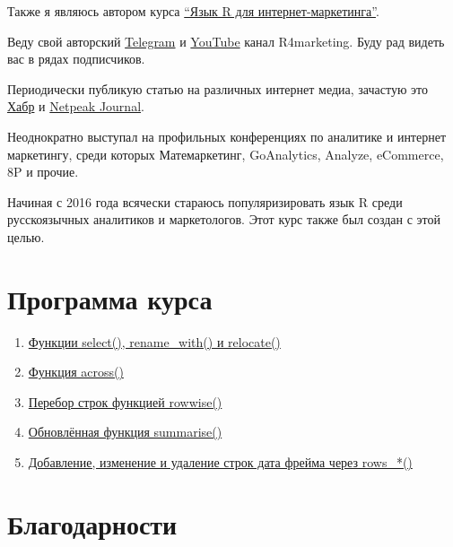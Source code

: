 \documentclass[
]{book}
\providecommand{\tightlist}{%
  \setlength{\itemsep}{0pt}\setlength{\parskip}{0pt}}
\begin{document}
Также я являюсь автором курса \href{https://needfordata.ru/r}{``Язык R для интернет-маркетинга''}.

Веду свой авторский \href{https://t.me/R4marketing}{Telegram} и \href{https://www.youtube.com/R4marketing/?sub_confirmation=1}{YouTube} канал R4marketing. Буду рад видеть вас в рядах подписчиков.

Периодически публикую статью на различных интернет медиа, зачастую это \href{https://habr.com/ru/users/selesnow/}{Хабр} и \href{https://netpeak.net/ru/blog/user/publication/826/}{Netpeak Journal}.

Неоднократно выступал на профильных конференциях по аналитике и интернет маркетингу, среди которых Матемаркетинг, GoAnalytics, Analyze, eCommerce, 8P и прочие.

Начиная с 2016 года всячески стараюсь популяризировать язык R среди русскоязычных аналитиков и маркетологов. Этот курс также был создан с этой целью.

\hypertarget{ux43fux440ux43eux433ux440ux430ux43cux43cux430-ux43aux443ux440ux441ux430}{%
\section*{Программа курса}\label{ux43fux440ux43eux433ux440ux430ux43cux43cux430-ux43aux443ux440ux441ux430}}

\begin{enumerate}
\def\labelenumi{\arabic{enumi}.}
\tightlist
\item
  \href{функции-select-rename_with-и-relocate.html}{Функции select(), rename\_with() и relocate()}
\item
  \href{функция-across.html}{Функция across()}
\item
  \href{перебор-строк-функцией-rowwise.html}{Перебор строк функцией rowwise()}
\item
  \href{обновлённая-функция-summarise.html}{Обновлённая функция summarise()}
\item
  \href{добавление-изменение-и-удаление-строк-дата-фрейма-через-rows_.html}{Добавление, изменение и удаление строк дата фрейма через rows\_*()}
\end{enumerate}

\hypertarget{ux431ux43bux430ux433ux43eux434ux430ux440ux43dux43eux441ux442ux438}{%
\section*{Благодарности}\label{ux431ux43bux430ux433ux43eux434ux430ux440ux43dux43eux441ux442ux438}}
\end{document}
